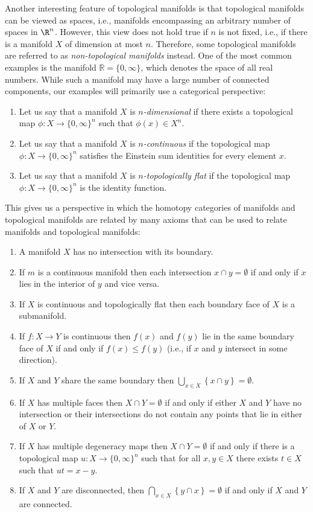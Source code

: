 \documentclass[a4paper,reqno,oneside]{article}
\begin{document}
Another interesting feature of topological manifolds is that topological manifolds can be viewed as spaces, i.e., manifolds encompassing an arbitrary number of spaces in $\R^n$. However, this view does not hold true if $n$ is not fixed, i.e., if there is a manifold $X$ of dimension at most $n$. Therefore, some topological manifolds are referred to as {\em non-topological manifolds} instead. One of the most common examples is the manifold $\mathbb{R} = \{0, \infty\}$, which denotes the space of all real numbers. While such a manifold may have a large number of connected components, our examples will primarily use a categorical perspective:
\begin{enumerate}[label=(\roman*)]
    \item Let us say that a manifold $X$ is \emph{$n$-dimensional} if there exists a topological map $\phi: X \to \{0,\infty\}^n$ such that $\phi(x) \in X^n$. 
    \item Let us say that a manifold $X$ is \emph{$n$-continuous} if the topological map $\phi: X \to \{0,\infty\}^n$ satisfies the Einstein sum identities for every element $x$. 
    \item Let us say that a manifold $X$ is \emph{$n$-topologically flat} if the topological map $\phi: X \to \{0,\infty\}^n$ is the identity function.
\end{enumerate}
This gives us a perspective in which the homotopy categories of manifolds and topological manifolds are related by many axioms that can be used to relate manifolds and topological manifolds: 
\begin{enumerate}[label=(\roman*)]
    \item A manifold $X$ has no intersection with its boundary. 
    \item If $m$ is a continuous manifold then each intersection $x \cap y = \emptyset$ if and only if $x$ lies in the interior of $y$ and vice versa. 
    \item If $X$ is continuous and topologically flat then each boundary face of $X$ is a submanifold. 
    \item If $f: X \to Y$ is continuous then $f(x)$ and $f(y)$ lie in the same boundary face of $X$ if and only if $f(x) \leq f(y)$ (i.e., if $x$ and $y$ intersect in some direction). 
    \item If $X$ and $Y$ share the same boundary then $\bigcup_{x \in X} \left\{ x \cap y \right\} = \emptyset$. 
    \item If $X$ has multiple faces then $X \cap Y = \emptyset$ if and only if either $X$ and $Y$ have no intersection or their intersections do not contain any points that lie in either of $X$ or $Y$. 
    \item If $X$ has multiple degeneracy maps then $X \cap Y = \emptyset$ if and only if there is a topological map $u: X \to \{0,\infty\}^n$ such that for all $x,y \in X$ there exists $t \in X$ such that $ut = x - y$. 
    \item If $X$ and $Y$ are disconnected, then $\bigcap_{x \in X} \left\{ y \cap x \right\} = \emptyset$ if and only if $X$ and $Y$ are connected. 
\end{enumerate}
\end{document}
